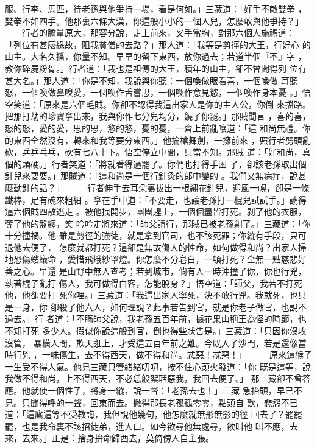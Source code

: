 \begin{pinyinscope}
{服、行李、馬匹，待老孫與他爭持一場，看是何如。」三藏道：「好手不敵雙拳
，雙拳不如四手。他那裏六條大漢，你這般小小的一個人兒，怎麼敢與他爭持？」
　　行者的膽量原大，那容分說，走上前來，叉手當胸，對那六個人施禮道：
「列位有甚麼緣故，阻我貧僧的去路？」那人道：「我等是剪徑的大王，行好心
的山主。大名久播，你量不知。早早的留下東西，放你過去；若道半個『不』字
，教你碎屍粉骨。」行者道：「我也是祖傳的大王，積年的山主，卻不曾聞得列
位有甚大名。」那人道：「你是不知，我說與你聽：一個喚做眼看喜，一個喚做
耳聽怒，一個喚做鼻嗅愛，一個喚作舌嘗思，一個喚作意見慾，一個喚作身本憂
。」悟空笑道：「原來是六個毛賊。你卻不認得我這出家人是你的主人公，你倒
來擋路。把那打劫的珍寶拿出來，我與你作七分兒均分，饒了你罷。」那賊聞言
，喜的喜，怒的怒，愛的愛，思的思，慾的慾，憂的憂，一齊上前亂嚷道：「這
和尚無禮。你的東西全然沒有，轉來和我等要分東西。」他掄槍舞劍，一擁前來
，照行者劈頭亂砍，乒乒乓乓，砍有七八十下。悟空停立中間，只當不知。那賊
道：「好和尚，真個的頭硬。」行者笑道：「將就看得過罷了。你們也打得手困
了，卻該老孫取出個針兒來耍耍。」那賊道：「這和尚是一個行針灸的郎中變的
。我們又無病症，說甚麼動針的話？」
　　
行者伸手去耳朵裏拔出一根繡花針兒，迎風一幌，卻是一條鐵棒，足有碗來粗細
。拿在手中道：「不要走，也讓老孫打一棍兒試試手。」諕得這六個賊四散逃走
。被他拽開步，團團趕上，一個個盡皆打死。剝了他的衣服，奪了他的盤纏，笑
吟吟走將來道：「師父請行，那賊已被老孫剿了。」三藏道：「你十分撞禍。他
雖是剪徑的強徒，就是拿到官司，也不該死罪；你縱有手段，只可退他去便了，
怎麼就都打死？這卻是無故傷人的性命，如何做得和尚？出家人掃地恐傷螻蟻命
，愛惜飛蛾紗罩燈。你怎麼不分皂白，一頓打死？全無一點慈悲好善之心。早還
是山野中無人查考；若到城市，倘有人一時沖撞了你，你也行兇，執著棍子亂打
傷人，我可做得白客，怎能脫身？」悟空道：「師父，我若不打死他，他卻要打
死你哩。」三藏道：「我這出家人寧死，決不敢行兇。我就死，也只是一身，你
卻殺了他六人，如何理說？此事若告到官，就是你老子做官，也說不過去。」行
者道：「不瞞師父說，我老孫五百年前，據花果山稱王為怪的時節，也不知打死
多少人。假似你說這般到官，倒也得些狀告是。」三藏道：「只因你沒收沒管，
暴橫人間，欺天誑上，才受這五百年前之難。今既入了沙門，若是還像當時行兇
，一味傷生，去不得西天，做不得和尚。忒惡！忒惡！」
　　
原來這猴子一生受不得人氣。他見三藏只管緒緒叨叨，按不住心頭火發道：「你
既是這等，說我做不得和尚，上不得西天，不必恁般絮聒惡我，我回去便了。」
那三藏卻不曾答應。他就使一個性子，將身一縱，說一聲：「老孫去也！」三藏
急抬頭，早已不見。只聞得呼的一聲，回東而去。撇得那長老孤孤零零，點頭自
歎，悲怨不已道：「這廝這等不受教誨，我但說他幾句，他怎麼就無形無影的徑
回去了？罷罷罷，也是我命裏不該招徒弟，進人口。如今欲尋他無處尋，欲叫他
叫不應，去來，去來。」正是：捨身拚命歸西去，莫倚傍人自主張。
}
\end{pinyinscope}
